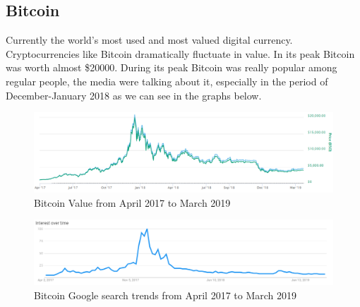 \subsection{Bitcoin}
Currently the world's most used and most valued digital currency. Cryptocurrencies like Bitcoin dramatically fluctuate in value. In its peak Bitcoin was worth almost \$20000. During its peak Bitcoin was really popular among regular people, the media were talking about it, especially in the period of December-January 2018 as we can see in the graphs below.

\begin{figure}[H]
    \begin{left}
        \begin{minipage}{\linewidth}
            \begin{left}
                \includegraphics[width=\textwidth,keepaspectratio]{img/bitcoin_value.png}
                \caption{Bitcoin Value from April 2017 to March 2019}
                \label{obr 1.2.1}
            \end{left}
        \end{minipage}
    \end{left}
\end{figure}

\begin{figure}[H]
    \begin{left}
        \begin{minipage}{\linewidth}
            \begin{left}
                \includegraphics[width=\textwidth,keepaspectratio]{img/bitcoin_trends.png}
                \caption{Bitcoin Google search trends from April 2017 to March 2019}
                \label{obr 1.2.2}
            \end{left}
        \end{minipage}
    \end{left}
\end{figure}

